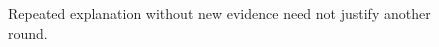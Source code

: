 \begin{figure}[H]
\centering
{}
\caption{Repeated explanation without new evidence need not justify another round.}\label{fig:teach-M06-13}
\end{figure}
